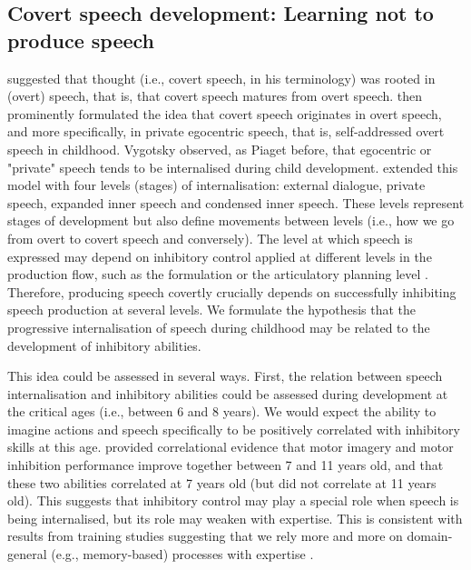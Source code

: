 \documentclass[utf8]{template/frontiersSCNS} %
\begin{document}
\subsection{Covert speech development: Learning not to produce speech}

\cite{watson_psychology_1919} suggested that thought (i.e., covert speech, in his terminology) was rooted in (overt) speech, that is, that covert speech matures from overt speech. \cite{vygotsky_thought_1934} then prominently formulated the idea that covert speech originates in overt speech, and more specifically, in private egocentric speech, that is, self-addressed overt speech in childhood. Vygotsky observed, as Piaget before, that egocentric or "private" speech tends to be internalised during child development. \cite{fernyhough_alien_2004} extended this model with four levels (stages) of internalisation: external dialogue, private speech, expanded inner speech and condensed inner speech. These levels represent stages of development but also define movements between levels (i.e., how we go from overt to covert speech and conversely). The level at which speech is expressed may depend on inhibitory control applied at different levels in the production flow, such as the formulation or the articulatory planning level \citep{grandchamp_condialint_2019}. Therefore, producing speech covertly crucially depends on successfully inhibiting speech production at several levels. We formulate the hypothesis that the progressive internalisation of speech during childhood may be related to the development of inhibitory abilities.

This idea could be assessed in several ways. First, the relation between speech internalisation and inhibitory abilities could be assessed during development at the critical ages (i.e., between 6 and 8 years). We would expect the ability to imagine actions and speech specifically to be positively correlated with inhibitory skills at this age. \cite{wang_relationship_2021} provided correlational evidence that motor imagery and motor inhibition performance improve together between 7 and 11 years old, and that these two abilities correlated at 7 years old (but did not correlate at 11 years old). This suggests that inhibitory control may play a special role when speech is being internalised, but its role may weaken with expertise. This is consistent with results from training studies suggesting that we rely more and more on domain-general (e.g., memory-based) processes with expertise \citep[e.g.,][]{tarr_mental_1989, jolicoeur_time_1985}.
\end{document}
